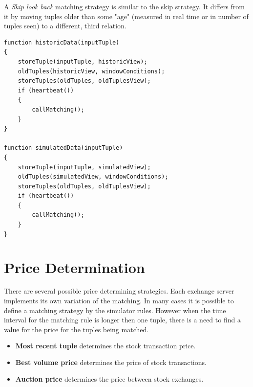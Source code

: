 \documentclass{article}
\begin{document}
\noindent A \emph{Skip look back} matching strategy is similar to the skip strategy. It differs from it by moving tuples older than some "age" (measured in real time or in number of tuples seen) to a different, third relation.
\begin{verbatim}   
function historicData(inputTuple)
{
    storeTuple(inputTuple, historicView);
    oldTuples(historicView, windowConditions);
    storeTuples(oldTuples, oldTuplesView);
    if (heartbeat())
    {
        callMatching();
    }
}

function simulatedData(inputTuple)
{
    storeTuple(inputTuple, simulatedView);
    oldTuples(simulatedView, windowConditions);
    storeTuples(oldTuples, oldTuplesView);
    if (heartbeat())
    {
        callMatching();
    }
}
\end{verbatim}


\section{Price Determination}

There are several possible price determining strategies. Each exchange server implements its own variation of the matching. In many cases it is possible to define a matching strategy by the simulator rules. However when the time interval for the matching rule is longer then one tuple, there is a need to find a value for the price for the tuples being matched.

\begin{itemize}
    \item {\bf Most recent tuple} determines the stock transaction price.
    \item {\bf Best volume price} determines the price of stock transactions.  
    \item {\bf Auction price} determines the price between stock exchanges.
\end{itemize}
\end{document}
